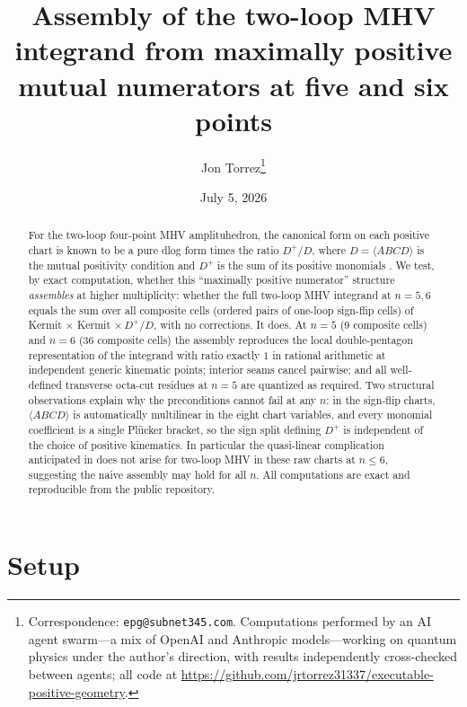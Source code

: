 \documentclass[11pt]{article}
\title{Assembly of the two-loop MHV integrand from maximally positive
mutual numerators at five and six points}
\author{Jon Torrez\thanks{Correspondence: \texttt{epg@subnet345.com}.
Computations performed by an AI agent swarm---a mix of OpenAI and Anthropic
models---working on quantum physics under the author's direction, with
results independently cross-checked between agents; all code at
\url{https://github.com/jrtorrez31337/executable-positive-geometry}.}}
\date{July 5, 2026}
\newcommand{\br}[1]{\langle #1 \rangle}
\begin{document}
\maketitle

\begin{abstract}
For the two-loop four-point MHV amplituhedron, the canonical form on
each positive chart is known to be a pure dlog form times the ratio
$D^{+}/D$, where $D = \br{ABCD}$ is the mutual positivity condition and
$D^{+}$ is the sum of its positive monomials
\citep{Kojima:2020gxs}. We test, by exact computation, whether this
``maximally positive numerator'' structure \emph{assembles} at higher
multiplicity: whether the full two-loop MHV integrand at $n=5,6$ equals
the sum over all composite cells (ordered pairs of one-loop sign-flip
cells) of Kermit $\times$ Kermit $\times\, D^{+}/D$, with no
corrections. It does. At $n=5$ (9 composite cells) and $n=6$ (36
composite cells) the assembly reproduces the local double-pentagon
representation of the integrand \citep{ArkaniHamed:2010gh} with ratio
exactly $1$ in rational arithmetic at independent generic kinematic
points; interior seams cancel pairwise; and all well-defined transverse
octa-cut residues at $n=5$ are quantized as required. Two structural
observations explain why the preconditions cannot fail at any $n$: in
the sign-flip charts, $\br{ABCD}$ is automatically multilinear in the
eight chart variables, and every monomial coefficient is a single
Pl\"ucker bracket, so the sign split defining $D^{+}$ is independent of
the choice of positive kinematics. In particular the quasi-linear
complication anticipated in \citep{Kojima:2020gxs} does not arise for
two-loop MHV in these raw charts at $n \le 6$, suggesting the naive
assembly may hold for all $n$. All computations are exact and
reproducible from the public repository.
\end{abstract}

\section{Setup}
\end{document}

